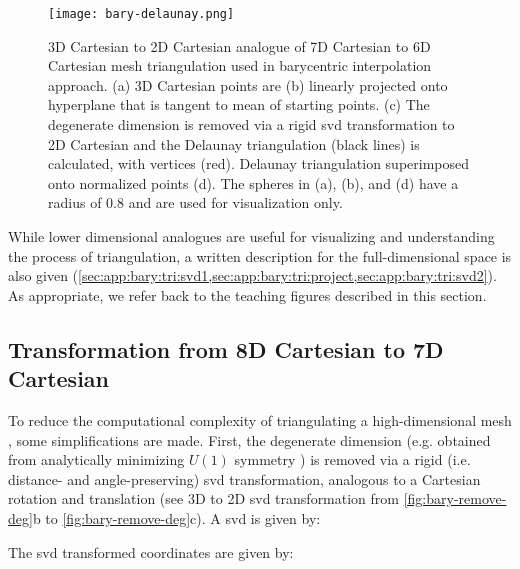 \documentclass[final,12pt]{elsarticle}
\begin{document}
\begin{figure}
	\centering
	\texttt{[image: bary-delaunay.png]}
	\caption{3D Cartesian to 2D Cartesian analogue of 7D Cartesian to 6D Cartesian mesh triangulation used in barycentric interpolation approach. (a) 3D Cartesian \inpt{} points are (b) linearly projected onto hyperplane that is tangent to mean of starting points. (c) The degenerate dimension is removed via a rigid \gls{svd} transformation to 2D Cartesian and the Delaunay triangulation (black lines) is calculated, with \inpt{} vertices (red). Delaunay triangulation superimposed onto normalized \inpt{} points (d). The spheres in (a), (b), and (d) have a radius of 0.8 and are used for visualization only.}
	\label{fig:bary-delaunay}
\end{figure}

While lower dimensional analogues are useful for visualizing and understanding the process of triangulation, a written description for the full-dimensional space is also given (\cref{sec:app:bary:tri:svd1,sec:app:bary:tri:project,sec:app:bary:tri:svd2}). As appropriate, we refer back to the teaching figures described in this section.

\subsection{ Transformation from 8D Cartesian to 7D Cartesian}
\label{sec:app:bary:tri:svd1}
To reduce the computational complexity of triangulating a high-dimensional mesh \cite{barberQuickhullAlgorithmConvex1996}, some simplifications are made. First, the degenerate dimension (e.g. obtained from analytically minimizing $U(1)$ symmetry \cite{francisGeodesicOctonionMetric2019}) is removed via a rigid (i.e. distance- and angle-preserving) \gls{svd} transformation,
analogous to a Cartesian rotation and translation (see 3D to 2D \gls{svd} transformation from \cref{fig:bary-remove-deg}b to \cref{fig:bary-remove-deg}c).
A \gls{svd} is given by:

The \gls{svd} transformed coordinates \cite{anatoliyCheckIfRay2015} are given by:

%
\end{document}
